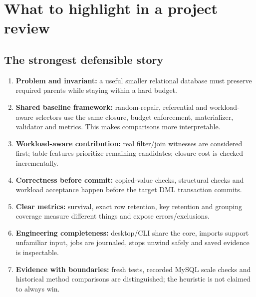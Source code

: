 \documentclass[11pt,a4paper,oneside]{report}
\begin{document}
\chapter{What to highlight in a project review}
\section{The strongest defensible story}
\begin{enumerate}
\item \textbf{Problem and invariant:} a useful smaller relational database must preserve required parents while staying within a hard budget.
\item \textbf{Shared baseline framework:} random-repair, referential and workload-aware selectors use the same closure, budget enforcement, materializer, validator and metrics. This makes comparisons more interpretable.
\item \textbf{Workload-aware contribution:} real filter/join witnesses are considered first; table features prioritize remaining candidates; closure cost is checked incrementally.
\item \textbf{Correctness before commit:} copied-value checks, structural checks and workload acceptance happen before the target DML transaction commits.
\item \textbf{Clear metrics:} survival, exact row retention, key retention and grouping coverage measure different things and expose errors/exclusions.
\item \textbf{Engineering completeness:} desktop/CLI share the core, imports support unfamiliar input, jobs are journaled, stops unwind safely and saved evidence is inspectable.
\item \textbf{Evidence with boundaries:} fresh tests, recorded MySQL scale checks and historical method comparisons are distinguished; the heuristic is not claimed to always win.
\end{enumerate}
\end{document}
